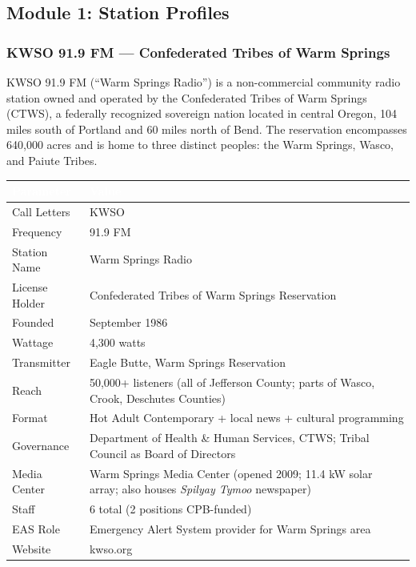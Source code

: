 \documentclass[11pt,letterpaper]{article}
\newcommand{\tableheader}[1]{\textbf{\sffamily\textcolor{white}{#1}}}
\begin{document}
\subsection{Module 1: Station Profiles}

\subsubsection{KWSO 91.9 FM --- Confederated Tribes of Warm Springs}

KWSO 91.9 FM (``Warm Springs Radio'') is a non-commercial community radio station owned and operated by the Confederated Tribes of Warm Springs (CTWS), a federally recognized sovereign nation located in central Oregon, 104 miles south of Portland and 60 miles north of Bend. The reservation encompasses 640,000 acres and is home to three distinct peoples: the Warm Springs, Wasco, and Paiute Tribes.

\begin{center}
\begin{tabularx}{\textwidth}{L{3.5cm}X}
\toprule
{}
\tableheader{Parameter} & \tableheader{Value} \\
\midrule
Call Letters & KWSO \\
Frequency & 91.9 FM \\
Station Name & Warm Springs Radio \\
License Holder & Confederated Tribes of Warm Springs Reservation \\
Founded & September 1986 \\
Wattage & 4,300 watts \\
Transmitter & Eagle Butte, Warm Springs Reservation \\
Reach & 50,000+ listeners (all of Jefferson County; parts of Wasco, Crook, Deschutes Counties) \\
Format & Hot Adult Contemporary + local news + cultural programming \\
Governance & Department of Health \& Human Services, CTWS; Tribal Council as Board of Directors \\
Media Center & Warm Springs Media Center (opened 2009; 11.4 kW solar array; also houses \textit{Spilyay Tymoo} newspaper) \\
Staff & 6 total (2 positions CPB-funded) \\
EAS Role & Emergency Alert System provider for Warm Springs area \\
Website & kwso.org \\
\bottomrule
\end{tabularx}
\end{center}
\end{document}
